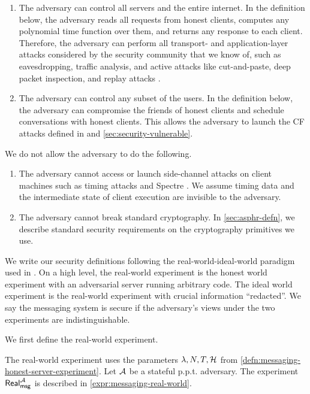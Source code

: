 \begin{enumerate}
    \item 
The adversary can control all servers and the entire internet. In the definition below, the adversary reads all requests from honest clients, computes any polynomial time function over them, and returns any response to each client. Therefore, the adversary can perform all transport- and application-layer attacks considered by the security community that we know of, such as eavesdropping, traffic analysis, and active attacks like cut-and-paste, deep packet inspection, and replay attacks \cite{DB1996sslsecurity}.
\item The adversary can control any subset of the users. In the definition below, the adversary can compromise the friends of honest clients and schedule conversations with honest clients. This allows the adversary to launch the CF attacks defined in \cite{angel2018cf} and \cref{sec:security-vulnerable}.
\end{enumerate}

We do not allow the adversary to do the following.
\begin{enumerate}
    \item 
The adversary cannot access or launch side-channel attacks on client machines such as timing attacks and Spectre \cite{Spectre}. We assume timing data and the intermediate state of client execution are invisible to the adversary.
\item The adversary cannot break standard cryptography. In \cref{sec:asphr-defn}, we describe standard security requirements on the cryptography primitives we use.
\end{enumerate}

We write our security definitions following the real-world-ideal-world paradigm used in \cite[Section 2.2]{shi2021non}. On a high level, the real-world experiment is the honest world experiment with an adversarial server running arbitrary code. The ideal world experiment is the real-world experiment with crucial information ``redacted''. We say the messaging system is secure if the adversary's views under the two experiments are indistinguishable.

We first define the real-world experiment.

\begin{definition}
\label{defn:messaging-real-world-experiment}
The real-world experiment uses the parameters $\lambda, N, T, \mathcal{H}$ from \cref{defn:messaging-honest-server-experiment}. Let $\mathcal{A}$ be a stateful p.p.t. adversary. The experiment $\mathsf{Real}_{\mathsf{msg}}^{\mathcal{A}}$ is described in \cref{expr:messaging-real-world}.
\end{definition}

